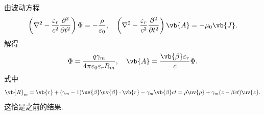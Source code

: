 \begin{note}
	由波动方程
	\begin{align*}
		\left( \nabla^{2} - \frac{\varepsilon_{r}}{c^{2}} \frac{\partial^{2}}{\partial t^{2}} \right) \Phi = -\frac{\rho}{\varepsilon_{0}}, \quad
		\left( \nabla^{2} - \frac{\varepsilon_{r}}{c^{2}} \frac{\partial^{2}}{\partial t^{2}} \right) \vb{A} = -\mu_{0} \vb{J}.
	\end{align*}
	解得
	\begin{align*}
		\Phi = \frac{q \gamma_{m}}{4\pi \varepsilon_{0} \varepsilon_{r} R_{m}}, \quad
		\vb{A} = \frac{\vb{\beta} \varepsilon_{r}}{c} \Phi.
	\end{align*}
	式中
	\begin{align*}
		\vb{R}_{m} = \vb{r} + (\gamma_{m} - 1) \uv{\beta} \uv{\beta} \cdot \vb{r} - \gamma_{m} \vb{\beta} c t = \rho \uv{\rho} + \gamma_{m} (z - \beta c t) \uv{z}.
	\end{align*}
	这恰是之前的结果.
\end{note}


